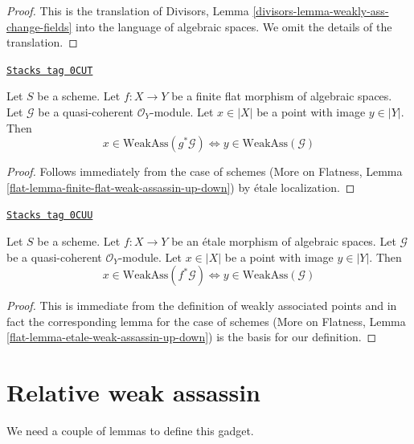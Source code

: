 \begin{proof}
This is the translation of
Divisors, Lemma \ref{divisors-lemma-weakly-ass-change-fields}
into the language of algebraic spaces. We omit the details of the
translation.
\end{proof}

\begin{lemma}
\label{spaces-divisors-lemma-finite-flat-weak-assassin-up-down}
\href{https://stacks.math.columbia.edu/tag/0CUT}{\texttt{Stacks tag 0CUT}}

Let $S$ be a scheme.
Let $f : X \to Y$ be a finite flat morphism of algebraic spaces.
Let $\mathcal{G}$ be a quasi-coherent $\mathcal{O}_Y$-module.
Let $x \in |X|$ be a point with image $y \in |Y|$. Then
$$
x \in \text{WeakAss}(g^*\mathcal{G})
\Leftrightarrow
y \in \text{WeakAss}(\mathcal{G})
$$
\end{lemma}

\begin{proof}
Follows immediately from the case of schemes
(More on Flatness, Lemma \ref{flat-lemma-finite-flat-weak-assassin-up-down})
by \'etale localization.
\end{proof}

\begin{lemma}
\label{spaces-divisors-lemma-etale-weak-assassin-up-down}
\href{https://stacks.math.columbia.edu/tag/0CUU}{\texttt{Stacks tag 0CUU}}

Let $S$ be a scheme.
Let $f : X \to Y$ be an \'etale morphism of algebraic spaces.
Let $\mathcal{G}$ be a quasi-coherent $\mathcal{O}_Y$-module.
Let $x \in |X|$ be a point with image $y \in |Y|$. Then
$$
x \in \text{WeakAss}(f^*\mathcal{G})
\Leftrightarrow
y \in \text{WeakAss}(\mathcal{G})
$$
\end{lemma}

\begin{proof}
This is immediate from the definition of weakly associated points
and in fact the corresponding lemma for the case of schemes
(More on Flatness, Lemma \ref{flat-lemma-etale-weak-assassin-up-down})
is the basis for our definition.
\end{proof}

\section{Relative weak assassin}
\label{spaces-divisors-section-relative-weak-assassin}
We need a couple of lemmas to define this gadget.

